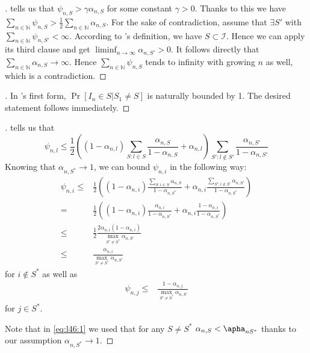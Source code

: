 \begin{proof}[]
   tells us that $\psi_{n, S} > \gamma
  \alpha_{n, S}$ for some constant $\gamma > 0$. Thanks to this we have $\sum_{n
  \in \mathbb{N}} \psi_{n, S} > \frac{1}{2} \sum_{n \in \mathbb{N}} \alpha_{n,
  S}$. For the sake of contradiction, assume that $\exists S'$ with $\sum_{n \in
  \mathbb{N}} \psi_{n, S'} < \infty$. According to
  's definition, we have $S \subset \mathcal{I}$.
  Hence we can apply its third clause and get $\liminf_{n \rightarrow \infty}
  \alpha_{n, S'} > 0$. It follows directly that $\sum_{n \in \mathbb{N}}
  \alpha_{n, S} \rightarrow \infty$. Hence $\sum_{n \in \mathbb{N}} \psi_{n, S}$
  tends to infinity with growing $n$ as well, which is a contradiction.
\end{proof}

\begin{proof}[]
  In 's first form,  $\Pr[I_n \in S | S_1
  \neq S]$ is naturally bounded by 1. The desired statement follows immediately.
\end{proof}

\begin{proof}[]
   tells us that
  \[\psi_{n, l} \leq \frac{1}{2}((1 - \alpha_{n, l}) \sum_{S: l \in S}
      \frac{\alpha_{n, S}}{1 - \alpha_{n, S}} + \alpha_{n, l})
      \sum_{S': l \notin S'} \frac{\alpha_{n, S'}}{1 - \alpha_{n, S'}}\]
  Knowing that $\alpha_{n, S^*} \rightarrow 1$, we can bound $\psi_{n, i}$ in
  the following way:
  \begin{align}
    \psi_{n, i} \leq& \frac{1}{2}((1 - \alpha_{n, i}) \frac{\sum_{S: i \in S}
        \alpha_{n, S}}{1 - \alpha_{n, S^*}} + \alpha_{n, i} \frac{\sum_{S': i
        \notin S'} \alpha_{n, S'}}{1 - \alpha_{n, S^*}}) \label{eq:l46:1}\\
      =& \frac{1}{2}((1 - \alpha_{n, i}) \frac{\alpha_{n, i}}{1 - \alpha_{n,
          S^*}} + \alpha_{n, i} \frac{1 - \alpha_{n, i}}{1 - \alpha_{n, S^*}})\\
      \leq& \frac{1}{2} \frac{2 \alpha_{n, i} (1 - \alpha_{n, i})}{\max_{S'
          \neq S^*} \alpha_{n, S'}} \\
      \leq& \frac{\alpha_{n, i}}{\max_{S' \neq S^*} \alpha_{n, S'}}
  \end{align}
  for $i \notin S^*$ as well as
  \begin{align}
    \psi_{n, j} \leq& \frac{1 - \alpha_{n, j}}{\max_{S' \neq S^*} \alpha_{n,
        S'}}
  \end{align}
  for $j \in S^*$.

  Note that in \eqref{eq:l46:1} we used that for any $S \neq S^*$ $\alpha_{n, S} < \apha_{n S^*}$ thanks to our assumption $\alpha_{n, S^*} \rightarrow 1$.
\end{proof}

